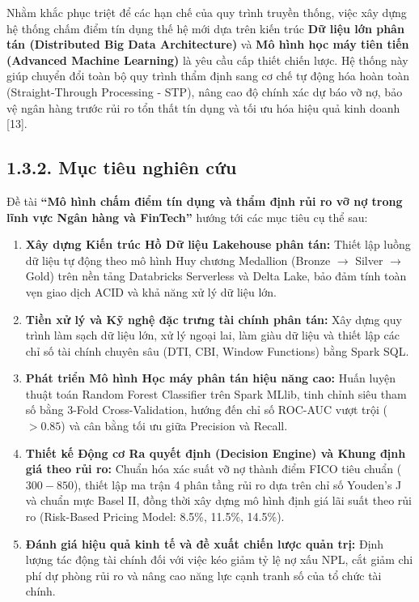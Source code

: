 \documentclass[
  13pt,
  a4paper,
]{report}
\providecommand{\tightlist}{%
  \setlength{\itemsep}{0pt}\setlength{\parskip}{0pt}}
\begin{document}
Nhằm khắc phục triệt để các hạn chế của quy trình truyền thống, việc xây
dựng hệ thống chấm điểm tín dụng thế hệ mới dựa trên kiến trúc
\textbf{Dữ liệu lớn phân tán (Distributed Big Data Architecture)} và
\textbf{Mô hình học máy tiên tiến (Advanced Machine Learning)} là yêu
cầu cấp thiết chiến lược. Hệ thống này giúp chuyển đổi toàn bộ quy trình
thẩm định sang cơ chế tự động hóa hoàn toàn (Straight-Through Processing
- STP), nâng cao độ chính xác dự báo vỡ nợ, bảo vệ ngân hàng trước rủi
ro tổn thất tín dụng và tối ưu hóa hiệu quả kinh doanh {[}13{]}.

\subsection{1.3.2. Mục tiêu nghiên
cứu}\label{mux1ee5c-tiuxeau-nghiuxean-cux1ee9u}

Đề tài \textbf{``Mô hình chấm điểm tín dụng và thẩm định rủi ro vỡ nợ
trong lĩnh vực Ngân hàng và FinTech''} hướng tới các mục tiêu cụ thể
sau:

\begin{enumerate}
\def\labelenumi{\arabic{enumi}.}
\tightlist
\item
  \textbf{Xây dựng Kiến trúc Hồ Dữ liệu Lakehouse phân tán:} Thiết lập
  luồng dữ liệu tự động theo mô hình Huy chương Medallion (Bronze
  \(\rightarrow\) Silver \(\rightarrow\) Gold) trên nền tảng Databricks
  Serverless và Delta Lake, bảo đảm tính toàn vẹn giao dịch ACID và khả
  năng xử lý dữ liệu lớn.
\item
  \textbf{Tiền xử lý và Kỹ nghệ đặc trưng tài chính phân tán:} Xây dựng
  quy trình làm sạch dữ liệu lớn, xử lý ngoại lai, làm giàu dữ liệu và
  thiết lập các chỉ số tài chính chuyên sâu (DTI, CBI, Window Functions)
  bằng Spark SQL.
\item
  \textbf{Phát triển Mô hình Học máy phân tán hiệu năng cao:} Huấn luyện
  thuật toán Random Forest Classifier trên Spark MLlib, tinh chỉnh siêu
  tham số bằng 3-Fold Cross-Validation, hướng đến chỉ số ROC-AUC vượt
  trội (\(> 0.85\)) và cân bằng tối ưu giữa Precision và Recall.
\item
  \textbf{Thiết kế Động cơ Ra quyết định (Decision Engine) và Khung định
  giá theo rủi ro:} Chuẩn hóa xác suất vỡ nợ thành điểm FICO tiêu chuẩn
  (\(300 - 850\)), thiết lập ma trận 4 phân tầng rủi ro dựa trên chỉ số
  Youden's J và chuẩn mực Basel II, đồng thời xây dựng mô hình định giá
  lãi suất theo rủi ro (Risk-Based Pricing Model: 8.5\%, 11.5\%,
  14.5\%).
\item
  \textbf{Đánh giá hiệu quả kinh tế và đề xuất chiến lược quản trị:}
  Định lượng tác động tài chính đối với việc kéo giảm tỷ lệ nợ xấu NPL,
  cắt giảm chi phí dự phòng rủi ro và nâng cao năng lực cạnh tranh số
  của tổ chức tài chính.
\end{enumerate}
\end{document}
